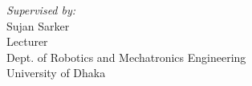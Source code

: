 \begin{titlepage}
\begin{minipage}{0.4\textwidth}
\begin{flushleft}
            \end{flushleft}
            
            
        \end{minipage}
        \begin{minipage}{0.4\textwidth}
            \begin{flushright} \large
                \emph{Supervised by:} \\
                Sujan Sarker\\
                Lecturer\\
                Dept. of Robotics and Mechatronics Engineering\\
                University of Dhaka %
            \end{flushright}
        \end{minipage}\\[1cm]
        \vfill        
		\vfill
		\vfill %
		
	\end{titlepage}